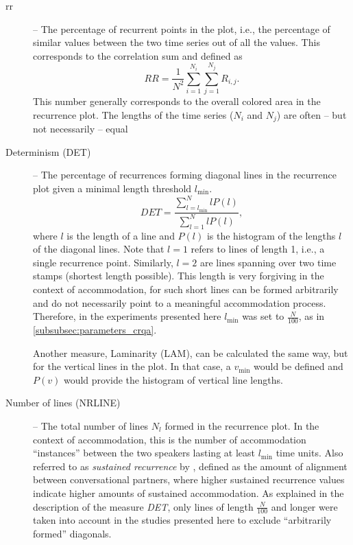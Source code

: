 \begin{description}
	\item[\Acf{rr}] -- The percentage of recurrent points in the plot, i.e., the percentage of similar values between the two time series out of all the values.
	This corresponds to the correlation sum and defined as
	\begin{equation}
		\label{eq:rr}
		RR = \frac{1}{N^2} \sum_{i=1}^{N_i} \sum_{j=1}^{N_j} R_{i,j}.
	\end{equation}
	This number generally corresponds to the overall colored area in the recurrence plot.
	The lengths of the time series ($N_i$ and $N_j$) are often -- but not necessarily -- equal
	
	\item[Determinism (DET)] -- The percentage of recurrences forming diagonal lines in the recurrence plot given a minimal length threshold $l_{\min}$.
	\begin{equation}
		\label{eq:det}
		DET = \frac{\sum_{l=l_{\min}}^{N} l P(l)}{\sum_{l=1}^N l P(l)},
	\end{equation}
	where $l$ is the length of a line and $P(l)$ is the histogram of the lengths $l$ of the diagonal lines.
	Note that $l=1$ refers to lines of length 1, i.e., a single recurrence point.	
	Similarly, $l=2$ are lines spanning over two time stamps (shortest length possible).
	This length is very forgiving in the context of accommodation, for such short lines can be formed arbitrarily and do not necessarily point to a meaningful accommodation process.
	Therefore, in the experiments presented here $l_{\min}$ was set to $\frac{N}{100}$, as in \cref{subsubsec:parameters_crqa}.
	
	Another measure, Laminarity (LAM), can be calculated the same way, but for the vertical lines in the plot.
	In that case, a $v_{\min}$ would be defined and $P(v)$ would provide the histogram of vertical line lengths.
	
	\item[Number of lines (NRLINE)] -- The total number of lines $N_l$ formed in the recurrence plot.
	In the context of accommodation, this is the number of accommodation \enquote{instances} between the two speakers lasting at least $l_{\min}$ time units.
	Also referred to as \emph{sustained recurrence} by \citet{Borrie2019syncing}, defined as the amount of alignment between conversational partners, where higher sustained recurrence values indicate higher amounts of sustained accommodation.
	As explained in the description of the measure \emph{DET}, only lines of length $\frac{N}{100}$ and longer were taken into account in the studies presented here to exclude \enquote{arbitrarily formed} diagonals.
	

\end{description}
